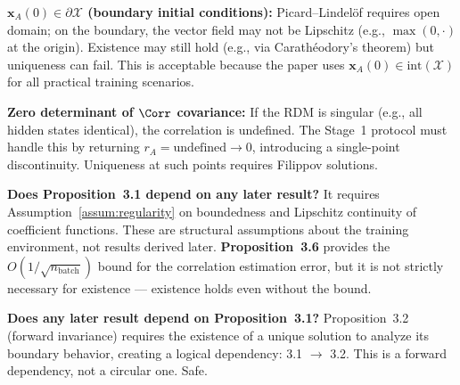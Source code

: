 \begin{boundary-case}
\textbf{$\mathbf{x}_A(0) \in \partial\mathcal{X}$ (boundary initial
conditions):} Picard--Lindelöf requires open domain; on the boundary,
the vector field may not be Lipschitz (e.g., $\max(0,\cdot)$ at the
origin). Existence may still hold (e.g., via Carathéodory's theorem)
but uniqueness can fail. This is acceptable because the paper uses
$\mathbf{x}_A(0) \in \text{int}(\mathcal{X})$ for all practical
training scenarios.

\textbf{Zero determinant of $\Corr$ covariance:} If the RDM is
singular (e.g., all hidden states identical), the correlation is
undefined. The Stage~1 protocol must handle this by returning
$r_A = \text{undefined} \to 0$, introducing a single-point
discontinuity. Uniqueness at such points requires Filippov
solutions.
\end{boundary-case}

\begin{circularity-check}
\textbf{Does Proposition~3.1 depend on any later result?} It requires
Assumption~\ref{assum:regularity} on boundedness and Lipschitz
continuity of coefficient functions. These are structural assumptions
about the training environment, not results derived later. 
\textbf{Proposition~3.6} provides the $O(1/\sqrt{n_{\text{batch}}})$
bound for the correlation estimation error, but it is not strictly
necessary for existence --- existence holds even without the bound.

\textbf{Does any later result depend on Proposition~3.1?}
Proposition~3.2 (forward invariance) requires the existence of a
unique solution to analyze its boundary behavior, creating a logical
dependency: 3.1 $\to$ 3.2. This is a forward dependency, not a
circular one. Safe.
\end{circularity-check}
